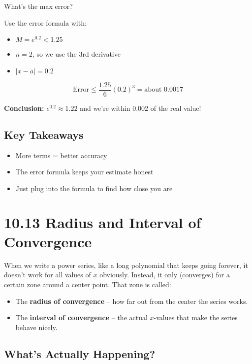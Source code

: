 \documentclass{article}
\begin{document}
What’s the max error?

Use the error formula with:
\begin{itemize}
  \item \(M = e^{0.2} < 1.25\)
  \item \(n = 2\), so we use the 3rd derivative
  \item \(|x - a| = 0.2\)
\end{itemize}

\[
\text{Error} \le \frac{1.25}{6} (0.2)^3 = \text{about } 0.0017
\]

\textbf{Conclusion:} \(e^{0.2} \approx 1.22\) and we’re within 0.002 of the real value!

\subsection*{Key Takeaways}
\begin{itemize}
  \item More terms = better accuracy
  \item The error formula keeps your estimate honest
  \item Just plug into the formula to find how close you are
\end{itemize}

\newpage
\section{10.13 Radius and Interval of Convergence}

\begin{tcolorbox}[colback=gray!8,colframe=black,title=Big Idea (How I like to understand this)]
When we write a power series, like a long polynomial that keeps going forever, it doesn’t work for all values of \(x\) obviously.
Instead, it only (converges) for a certain zone around a center point. That zone is called:
\begin{itemize}
  \item The \textbf{radius of convergence} – how far out from the center the series works.
  \item The \textbf{interval of convergence} – the actual \(x\)-values that make the series behave nicely.
\end{itemize}
\end{tcolorbox}

\subsection*{What's Actually Happening?}
\end{document}

